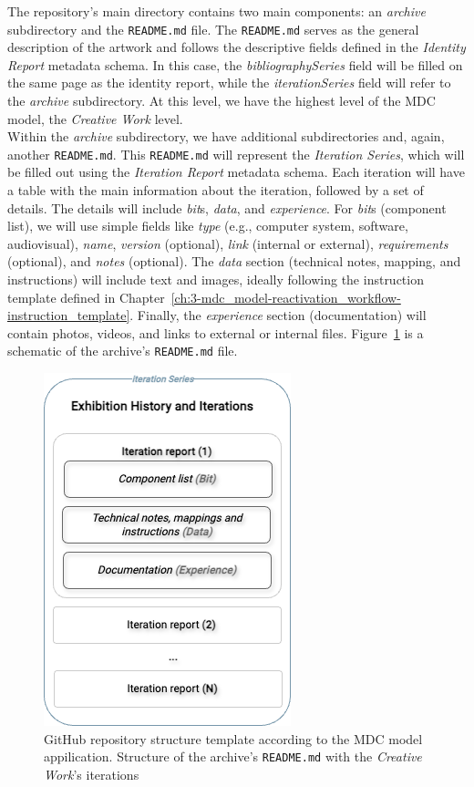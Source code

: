 The repository's main directory contains two main components: an \textit{archive} subdirectory and the \texttt{README.md} file. The \texttt{README.md} serves as the general description of the artwork and follows the descriptive fields defined in the \textit{Identity Report} metadata schema. In this case, the \textit{bibliographySeries} field will be filled on the same page as the identity report, while the \textit{iterationSeries} field will refer to the \textit{archive} subdirectory. At this level, we have the highest level of the MDC model, the \textit{Creative Work} level.\\
Within the \textit{archive} subdirectory, we have additional subdirectories and, again, another \texttt{README.md}. This \texttt{README.md} will represent the \textit{Iteration Series}, which will be filled out using the \textit{Iteration Report} metadata schema. Each iteration will have a table with the main information about the iteration, followed by a set of details. The details will include \textit{bit}s, \textit{data}, and \textit{experience}. For \textit{bit}s (component list), we will use simple fields like \textit{type} (e.g., computer system, software, audiovisual), \textit{name}, \textit{version} (optional), \textit{link} (internal or external), \textit{requirements} (optional), and \textit{notes} (optional). The \textit{data} section (technical notes, mapping, and instructions) will include text and images, ideally following the instruction template defined in Chapter~\ref{ch:3-mdc_model-reactivation_workflow-instruction_template}. Finally, the \textit{experience} section (documentation) will contain photos, videos, and links to external or internal files. Figure~\ref{fig:c4-github-template02} is a schematic of the archive’s \texttt{README.md} file.

\begin{figure}[!h]
    \centering
    \includegraphics[width=0.4\linewidth]{chapters/4-MDC_model_application/image/graph04-githubtemplate02.png}
    \caption{GitHub repository structure template according to the MDC model appilication. Structure of the archive's \texttt{README.md} with the \textit{Creative Work}'s iterations}
    \label{fig:c4-github-template02}
\end{figure}

